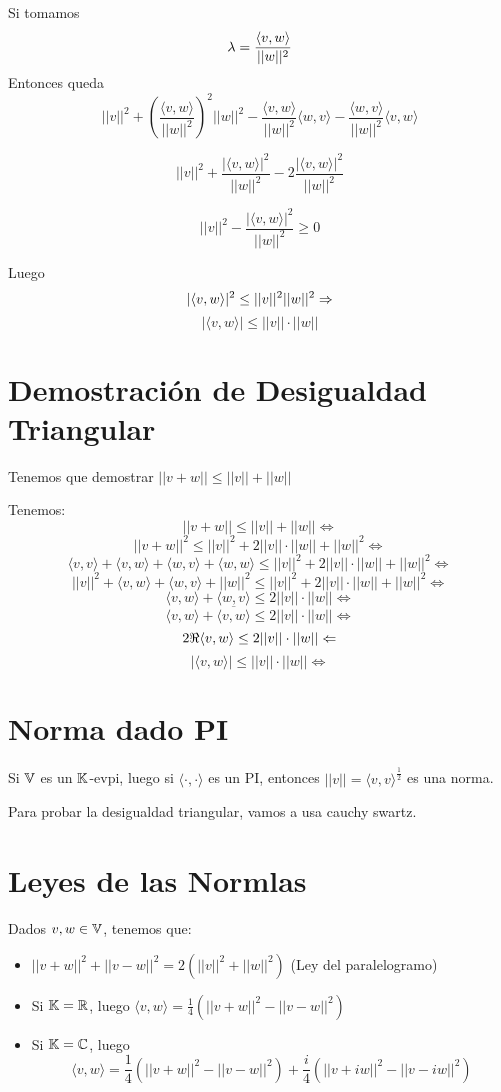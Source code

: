 \documentclass{article}
\begin{document}
Si tomamos \[\lambda = \frac{\langle v, w \rangle}{||w||^2}\]
Entonces queda
\[||v||^2
	+ \left(\frac{\langle v, w \rangle}{||w||^2}\right)^2||w||^2
- \frac{\langle v, w \rangle}{||w||^2}\langle w, v \rangle
- \frac{\langle w, v \rangle}{||w||^2} \langle v, w \rangle\]

\[||v||^2
	+ \frac{|\langle v, w \rangle|^2}{||w||^2}
- 2\frac{|\langle v, w \rangle|^2}{||w||^2}
\]

\[||v||^2
	- \frac{|\langle v, w \rangle|^2}{||w||^2} \geq 0
\]

Luego
\[
	|\langle v, w \rangle|^2 \leq ||v||^2||w||^2 \Rightarrow
\]
\[
	|\langle v, w \rangle| \leq ||v|| \cdot ||w||
\]

\section*{Demostración de Desigualdad Triangular}
Tenemos que demostrar $||v+w|| \leq ||v|| + ||w||$

Tenemos:
\[||v+w|| \leq ||v|| + ||w|| \iff\]
\[||v+w||^2 \leq ||v||^2 + 2||v|| \cdot ||w|| + ||w||^2 \iff\]
\[\langle v, v \rangle + \langle v, w \rangle + \langle w, v \rangle + \langle w, w \rangle \leq ||v||^2 + 2||v|| \cdot ||w|| + ||w||^2 \iff\]
\[||v||^2 + \langle v, w \rangle + \langle w, v \rangle + ||w||^2 \leq ||v||^2 + 2||v|| \cdot ||w|| + ||w||^2 \iff\]
\[\langle v, w \rangle + \langle w, v \rangle\leq 2||v|| \cdot ||w|| \iff\]
\[\langle v, w \rangle + \overline {\langle v, w \rangle} \leq 2||v|| \cdot ||w|| \iff\]
\[2 \Re \langle v, w \rangle \leq 2||v|| \cdot ||w|| \Leftarrow\]
\[|\langle v, w \rangle| \leq ||v|| \cdot ||w|| \iff\]

\section*{Norma dado PI}
Si $\mathbb{V}$ es un $\mathbb{K}$-evpi, luego si $\langle \cdot , \cdot \rangle$ es un PI, entonces $||v|| = \langle v, v \rangle^{\frac{1}{2}}$ es una norma.

Para probar la desigualdad triangular, vamos a usa cauchy swartz.

\section*{Leyes de las Normlas}
Dados $v, w \in \mathbb{V}$, tenemos que:
\begin{itemize}
	\item $||v+w||^2 + ||v-w||^2 = 2(||v||^2 + ||w||^2)$ (Ley del paralelogramo)
	\item Si $\mathbb{K} = \mathbb{R}$, luego $\langle v, w \rangle = \frac{1}{4}(||v+w||^2 - ||v-w||^2)$
	\item Si $\mathbb{K} = \mathbb{C}$, luego
		\[\langle v, w \rangle = \frac{1}{4}(||v+w||^2 - ||v-w||^2)
		+ \frac{i}{4}(||v+iw||^2 - ||v-iw||^2)\]
\end{itemize}
\end{document}
